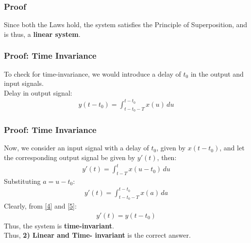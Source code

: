 \documentclass{beamer}
\begin{document}
\begin{frame}
    \frametitle{Proof}
    \begin{flushleft}
    Since both the Laws hold, the system satisfies the Principle of Superposition, and is thus, a \textbf{linear system}.\\
    \end{flushleft}
\end{frame}

\begin{frame}
    \frametitle{Proof: Time Invariance}
    \begin{flushleft}
    To check for time-invariance, we would introduce a delay of $t_0$ in the output and input signals.\\
Delay in output signal:
\begin{align}
    y(t-t_0) = \int_{t-t_0-T}^{t-t_0} x(u)\,du
    \label{4}
\end{align}
    \end{flushleft}
\end{frame}

\begin{frame}
    \frametitle{Proof: Time Invariance}
    \begin{flushleft}
    Now, we consider an input signal with a delay of $t_0$, given by $x(t-t_0)$, and let the corresponding output signal be given by $y'(t)$, then:
\begin{align}
    y'(t) = \int_{t-T}^{t} x(u-t_0)\,du
\end{align}
Substituting $a = u-t_0$:
\begin{align}
    y'(t) = \int_{t-t_0-T}^{t-t_0} x(a)\,da
    \label{5}
\end{align}
Clearly, from \eqref{4} and \eqref{5}:
\begin{align}
    y'(t) = y(t-t_0)
\end{align}
Thus, the system is \textbf{time-invariant}.\\

 Thus, \textbf{2) Linear and Time- invariant} is the correct answer.
    \end{flushleft}
\end{frame}
\end{document}

